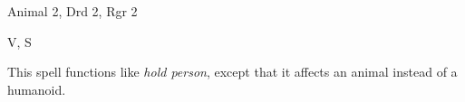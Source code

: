 
\begin{description*}
\item[Level:] Animal 2, Drd 2, Rgr 2
\item[Components:] V, S
\end{description*}

This spell functions like \textit{hold person}, except that it affects an animal
instead of a humanoid.